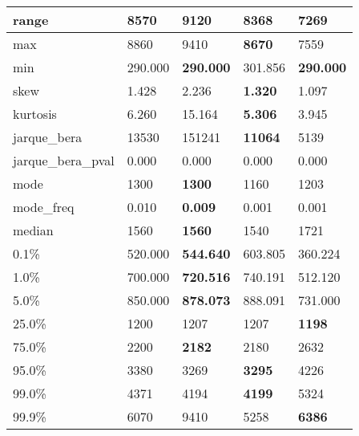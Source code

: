 \begin{table}[H]
\begin{tabular}{|l|m{10em}|m{10em}|m{10em}|m{10em}|}
\hline range & 8570 & 9120 & \bfseries 8368 & \cellcolor[rgb]{0.9, 0.54, 0.52} 7269 \\
\hline max & 8860 & 9410 & \bfseries 8670 & \cellcolor[rgb]{0.9, 0.54, 0.52} 7559 \\
\hline min & 290.000 & \bfseries 290.000 & \cellcolor[rgb]{0.9, 0.54, 0.52} 301.856 & \bfseries 290.000 \\
\hline skew & 1.428 & \cellcolor[rgb]{0.9, 0.54, 0.52} 2.236 & \bfseries 1.320 & 1.097 \\
\hline kurtosis & 6.260 & \cellcolor[rgb]{0.9, 0.54, 0.52} 15.164 & \bfseries 5.306 & 3.945 \\
\hline jarque\_bera & 13530 & \cellcolor[rgb]{0.9, 0.54, 0.52} 151241 & \bfseries 11064 & 5139 \\
\hline jarque\_bera\_pval & 0.000 & 0.000 & 0.000 & 0.000 \\
\hline mode & 1300 & \bfseries 1300 & \cellcolor[rgb]{0.9, 0.54, 0.52} 1160 & 1203 \\
\hline mode\_freq & 0.010 & \bfseries 0.009 & \cellcolor[rgb]{0.9, 0.54, 0.52} 0.001 & 0.001 \\
\hline median & 1560 & \bfseries 1560 & 1540 & \cellcolor[rgb]{0.9, 0.54, 0.52} 1721 \\
\hline 0.1\% & 520.000 & \bfseries 544.640 & 603.805 & \cellcolor[rgb]{0.9, 0.54, 0.52} 360.224 \\
\hline 1.0\% & 700.000 & \bfseries 720.516 & 740.191 & \cellcolor[rgb]{0.9, 0.54, 0.52} 512.120 \\
\hline 5.0\% & 850.000 & \bfseries 878.073 & 888.091 & \cellcolor[rgb]{0.9, 0.54, 0.52} 731.000 \\
\hline 25.0\% & 1200 & 1207 & \cellcolor[rgb]{0.9, 0.54, 0.52} 1207 & \bfseries 1198 \\
\hline 75.0\% & 2200 & \bfseries 2182 & 2180 & \cellcolor[rgb]{0.9, 0.54, 0.52} 2632 \\
\hline 95.0\% & 3380 & 3269 & \bfseries 3295 & \cellcolor[rgb]{0.9, 0.54, 0.52} 4226 \\
\hline 99.0\% & 4371 & 4194 & \bfseries 4199 & \cellcolor[rgb]{0.9, 0.54, 0.52} 5324 \\
\hline 99.9\% & 6070 & \cellcolor[rgb]{0.9, 0.54, 0.52} 9410 & 5258 & \bfseries 6386 \\
\hline
\end{tabular}
\end{table}
